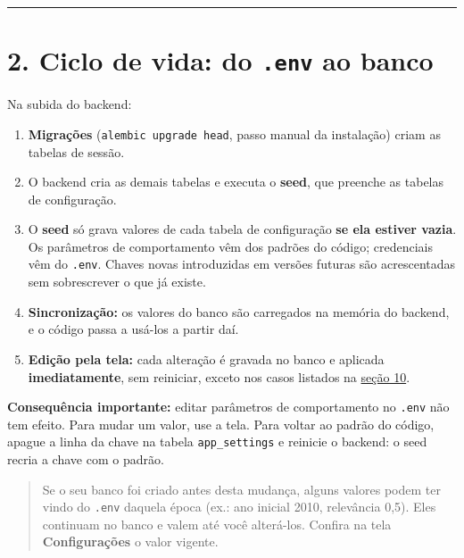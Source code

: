 \documentclass[
  brazilian,
  a4paper,12pt,oneside]{report}
\providecommand{\tightlist}{%
  \setlength{\itemsep}{0pt}\setlength{\parskip}{0pt}}
\begin{document}
\begin{center}\rule{0.5\linewidth}{0.5pt}\end{center}

\chapter{\texorpdfstring{2. Ciclo de vida: do
\texttt{.}\allowbreak{}\texttt{env} ao
banco}{2. Ciclo de vida: do .env ao banco}}\label{ciclo-de-vida-do-.env-ao-banco}

Na subida do backend:

\begin{enumerate}
\def\labelenumi{\arabic{enumi}.}
\tightlist
\item
  \textbf{Migrações} (\texttt{alembic\ upgrade\ head}, passo manual da
  instalação) criam as tabelas de sessão.
\item
  O backend cria as demais tabelas e executa o \textbf{seed}, que
  preenche as tabelas de configuração.
\item
  O \textbf{seed} só grava valores de cada tabela de configuração
  \textbf{se ela estiver vazia}. Os parâmetros de comportamento vêm dos
  padrões do código; credenciais vêm do
  \texttt{.}\allowbreak{}\texttt{env}. Chaves novas introduzidas em
  versões futuras são acrescentadas sem sobrescrever o que já existe.
\item
  \textbf{Sincronização:} os valores do banco são carregados na memória
  do backend, e o código passa a usá-los a partir daí.
\item
  \textbf{Edição pela tela:} cada alteração é gravada no banco e
  aplicada \textbf{imediatamente}, sem reiniciar, exceto nos casos
  listados na \hyperref[10-quando-reiniciar-o-backend]{seção 10}.
\end{enumerate}

\textbf{Consequência importante:} editar parâmetros de comportamento no
\texttt{.}\allowbreak{}\texttt{env} não tem efeito. Para mudar um valor,
use a tela. Para voltar ao padrão do código, apague a linha da chave na
tabela \texttt{app\_}\allowbreak{}\texttt{settings} e reinicie o
backend: o seed recria a chave com o padrão.

\begin{quote}
Se o seu banco foi criado antes desta mudança, alguns valores podem ter
vindo do \texttt{.}\allowbreak{}\texttt{env} daquela época (ex.: ano
inicial 2010, relevância 0,5). Eles continuam no banco e valem até você
alterá-los. Confira na tela \textbf{Configurações} o valor vigente.
\end{quote}
\end{document}
